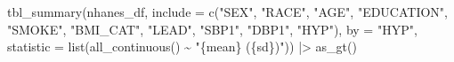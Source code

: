 \documentclass[
  letterpaper,
]{latex/krantz}
\makeatletter
\newenvironment{Shaded}{\begin{snugshade}}{\end{snugshade}}
\newcommand{\AttributeTok}[1]{\textcolor[rgb]{0.40,0.45,0.13}{#1}}
\newcommand{\FunctionTok}[1]{\textcolor[rgb]{0.28,0.35,0.67}{#1}}
\newcommand{\NormalTok}[1]{\textcolor[rgb]{0.00,0.23,0.31}{#1}}
\newcommand{\SpecialCharTok}[1]{\textcolor[rgb]{0.37,0.37,0.37}{#1}}
\newcommand{\StringTok}[1]{\textcolor[rgb]{0.13,0.47,0.30}{#1}}
\newenvironment{kframe}{%
\medskip{}
\setlength{\fboxsep}{.8em}
 \def\at@end@of@kframe{}%
 \ifinner\ifhmode%
  \def\at@end@of@kframe{\end{minipage}}%
  \begin{minipage}{\columnwidth}%
 \fi\fi%
 \def\FrameCommand##1{\hskip\@totalleftmargin \hskip-\fboxsep
 \colorbox{shadecolor}{##1}\hskip-\fboxsep
     \hskip-\linewidth \hskip-\@totalleftmargin \hskip\columnwidth}%
 \MakeFramed {\advance\hsize-\width
   \@totalleftmargin\z@ \linewidth\hsize
   \@setminipage}}%
 {\par\unskip\endMakeFramed%
 \at@end@of@kframe}
\renewenvironment{Shaded}{\begin{kframe}}{\end{kframe}}
\makeatother
\begin{document}
\begin{Shaded}
\begin{Highlighting}[]
\FunctionTok{tbl\_summary}\NormalTok{(nhanes\_df, }
            \AttributeTok{include =} \FunctionTok{c}\NormalTok{(}\StringTok{"SEX"}\NormalTok{, }\StringTok{"RACE"}\NormalTok{, }\StringTok{"AGE"}\NormalTok{, }\StringTok{"EDUCATION"}\NormalTok{, }\StringTok{"SMOKE"}\NormalTok{, }
                        \StringTok{"BMI\_CAT"}\NormalTok{, }\StringTok{"LEAD"}\NormalTok{, }\StringTok{"SBP1"}\NormalTok{, }\StringTok{"DBP1"}\NormalTok{, }\StringTok{"HYP"}\NormalTok{),}
            \AttributeTok{by =} \StringTok{"HYP"}\NormalTok{,}
            \AttributeTok{statistic =} \FunctionTok{list}\NormalTok{(}\FunctionTok{all\_continuous}\NormalTok{() }\SpecialCharTok{\textasciitilde{}} \StringTok{"\{mean\} (\{sd\})"}\NormalTok{)) }\SpecialCharTok{|\textgreater{}}
\FunctionTok{as\_gt}\NormalTok{() }
\end{Highlighting}
\end{Shaded}
\end{document}
